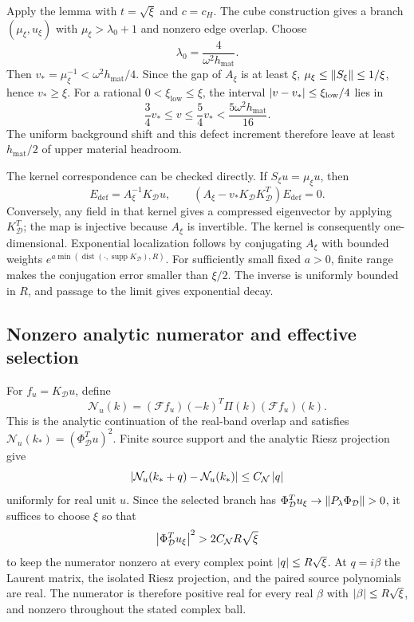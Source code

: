 Apply the lemma with \(t=\sqrt{\xi}\) and \(c=c_H\).
The cube construction gives a branch \((\mu_\xi,u_\xi)\) with
\(\mu_\xi>\lambda_0+1\) and nonzero edge overlap. Choose
\[
 \lambda_0=\frac4{\omega^2 h_{\mathrm{mat}}}.
\]
Then \(v_*=\mu_\xi^{-1}<\omega^2h_{\mathrm{mat}}/4\).
Since the gap of \(A_\xi\) is at least \(\xi\),
\(\mu_\xi\le\left\lVert S_\xi\right\rVert\le1/\xi\), hence \(v_*\ge\xi\).
For a rational \(0<\xi_{\mathrm{low}}\le\xi\), the interval
\(\left\lvert v-v_*\right\rvert\le\xi_{\mathrm{low}}/4\) lies in
\[
 \frac34v_*\le v\le\frac54v_*<\frac{5\omega^2 h_{\mathrm{mat}}}{16}.
\]
The uniform background shift and this defect increment therefore leave
at least \(h_{\mathrm{mat}}/2\) of upper material headroom.

The kernel correspondence can be checked directly. If
\(S_\xi u=\mu_\xi u\), then
\[
 E_{\mathrm{def}}=A_\xi^{-1}K_{\mathcal D}u,\qquad
 (A_\xi-v_*K_{\mathcal D}K_{\mathcal D}^T)E_{\mathrm{def}}=0.
\]
Conversely, any field in that kernel gives a compressed eigenvector by
applying \(K_{\mathcal D}^T\); the map is injective because \(A_\xi\) is
invertible. The kernel is consequently one-dimensional. Exponential
localization follows by conjugating \(A_\xi\) with bounded
weights \(e^{a\min(\operatorname{dist}(\cdot,\operatorname{supp}K_{\mathcal D}),R)}\).
For sufficiently small fixed \(a>0\), finite range makes the conjugation
error smaller than \(\xi/2\). The inverse is uniformly bounded in \(R\),
and passage to the limit gives exponential decay.

\subsection{Nonzero analytic numerator and effective selection}

For \(f_u=K_{\mathcal D}u\), define
\[
 \mathcal N_u(k)=(\mathcal Ff_u)(-k)^T\Pi(k)(\mathcal Ff_u)(k).
\]
This is the analytic continuation of the real-band overlap and satisfies
\(\mathcal N_u(k_*)=(\Phi_{\mathcal D}^Tu)^2\). Finite source support and the analytic
Riesz projection give
\[
 \left\lvert \mathcal N_u(k_*+q)-\mathcal N_u(k_*)\right\rvert
 \le C_{\mathcal N}\left\lvert q\right\rvert
\]
uniformly for real unit \(u\). Since the selected branch has
\(\Phi_{\mathcal D}^Tu_\xi\to\left\lVert P_\lambda\Phi_{\mathcal D}\right\rVert>0\), it suffices to choose \(\xi\)
so that
\[
 \left\lvert \Phi_{\mathcal D}^Tu_\xi\right\rvert^2>2C_{\mathcal N}R\sqrt{\xi}
\]
to keep the numerator nonzero at every complex point
\(\left\lvert q\right\rvert\le R\sqrt{\xi}\). At \(q=i\beta\) the Laurent matrix,
the isolated Riesz projection, and the paired source polynomials are real.
The numerator is therefore positive real for every real \(\beta\) with
\(\left\lvert \beta\right\rvert\le R\sqrt{\xi}\), and nonzero throughout the stated
complex ball.

